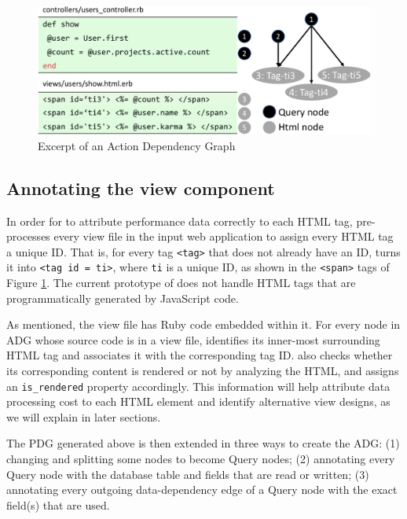 \begin{figure}
    \centering
    \includegraphics[width=0.7\columnwidth]{panorama-figs/code-example.pdf}
    \vspace{0.1in}
    \caption{Excerpt of an Action Dependency Graph}
    \label{fig:icq}
    \vspace{-0.2in}
\end{figure}

\subsection{Annotating the view component}
\label{sec:annotateview}
In order for \ToolP to attribute performance data correctly to each HTML tag,
\ToolP pre-processes every view file in the input web application
to assign every HTML tag a unique ID.
That is, for every tag {\tt <tag>} that does not already have an ID, 
\ToolP turns it into 
{\tt <tag id = ti>}, where {\tt ti} is a unique ID, as shown in the {\tt <span>} tags 
of Figure \ref{fig:icq}.
The current prototype of \ToolP does not handle HTML tags that are 
programmatically generated by JavaScript code.

As mentioned, the view file has Ruby code embedded within it. For every node in ADG whose source code is in a view file,
\ToolP identifies its inner-most surrounding HTML tag and associates it with the corresponding tag ID.
\ToolP also %
checks whether its corresponding content is rendered or not by analyzing the HTML, and
assigns an {\tt is\_rendered} property accordingly. 
This information will help \ToolP attribute data processing cost to each HTML element and identify alternative view designs, as we will explain in later sections.


\iffalse
The PDG generated above is then extended in three ways to create the ADG: 
(1) changing and splitting some nodes to become 
Query nodes; (2) annotating every Query node with the database table and fields that are read or written; 
(3) annotating every outgoing data-dependency edge of a Query node with the exact field(s) that are used.


